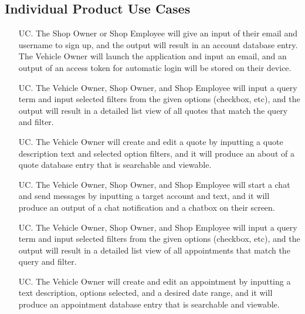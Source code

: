 \documentclass[12pt]{article}
\newcounter{usecasenum} %
\begin{document}
\subsection{Individual Product Use Cases}

\begin{itemize}

    \item[UC\refstepcounter{usecasenum}\theusecasenum \label{R_Output}.] The Shop Owner or Shop Employee will give an input of their email and username to sign up, and the output will result in an account database entry. The Vehicle Owner will launch the application and input an email, and an output of an access token for automatic login will be stored on their device.
    
    \item[UC\refstepcounter{usecasenum}\theusecasenum \label{R_Output}.] The Vehicle Owner, Shop Owner, and Shop Employee will input a query term and input selected filters from the given options (checkbox, etc), and the output will result in a detailed list view of all quotes that match the query and filter.
    
    \item[UC\refstepcounter{usecasenum}\theusecasenum \label{R_Output}.] The Vehicle Owner will create and edit a quote by inputting a quote description text and selected option filters, and it will produce an about of a quote database entry that is searchable and viewable.
    
    \item[UC\refstepcounter{usecasenum}\theusecasenum \label{R_Output}.] The Vehicle Owner, Shop Owner, and Shop Employee will start a chat and send messages by inputting a target account and text, and it will produce an output of a chat notification and a chatbox on their screen. 
    
    \item[UC\refstepcounter{usecasenum}\theusecasenum \label{R_Output}.] The Vehicle Owner, Shop Owner, and Shop Employee will input a query term and input selected filters from the given options (checkbox, etc), and the output will result in a detailed list view of all appointments that match the query and filter.
    
    \item[UC\refstepcounter{usecasenum}\theusecasenum \label{R_Output}.] The Vehicle Owner will create and edit an appointment by inputting a text description, options selected, and a desired date range, and it will produce an appointment  database entry that is searchable and viewable.
    

\end{itemize}
\end{document}
